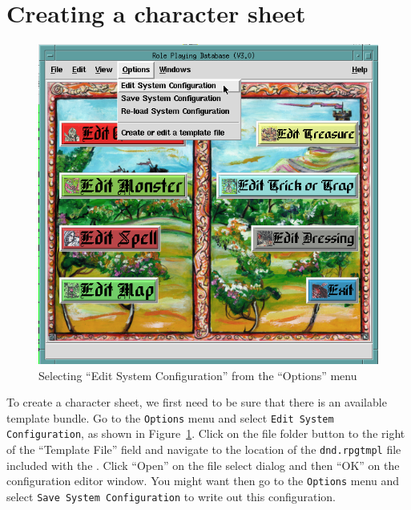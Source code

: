 \section{Creating a character sheet}

\begin{figure}[hbpt]
\begin{centering}
\includegraphics{OpenConfigurationEditor.png}
\caption{Selecting ``Edit System Configuration'' from the ``Options'' menu}
\label{fig:opensysconfedit}
\end{centering}
\end{figure}
To create a character sheet, we first need to be sure that there is an
available template bundle.  Go to the \verb=Options= menu and select
\verb=Edit System Configuration=, as shown in
Figure~\ref{fig:opensysconfedit}. Click on the file folder button to the
right of the ``Template File'' field and navigate to the location of the
\verb=dnd.rpgtmpl= file included with the \thesystem. Click ``Open'' on
the file select dialog and then ``OK'' on the configuration editor
window.  You might want then go to the \verb=Options= menu and select
\verb=Save System Configuration= to write out this configuration.

